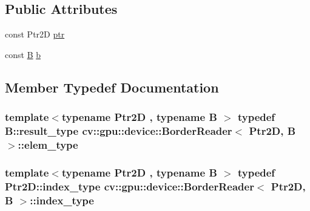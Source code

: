 \subsection*{Public Attributes}
\begin{DoxyCompactItemize}
\item 
const Ptr2\-D \hyperlink{structcv_1_1gpu_1_1device_1_1BorderReader_a7b33c15f65ff4160736d30ad12fc8f3e}{ptr}
\item 
const \hyperlink{tracking_8hpp_abfbb8a90031c2fb62897dafb4d390f6d}{B} \hyperlink{structcv_1_1gpu_1_1device_1_1BorderReader_ac633af0935bfd05794a8fe092c475895}{b}
\end{DoxyCompactItemize}


\subsection{Member Typedef Documentation}
\hypertarget{structcv_1_1gpu_1_1device_1_1BorderReader_a5030228ec7ba89b50ff06a7bdf3c6c24}{
\subsubsection[{elem\-\_\-type}]{\setlength{\rightskip}{0pt plus 5cm}template$<$typename Ptr2\-D , typename B $>$ typedef B\-::result\-\_\-type {\bf cv\-::gpu\-::device\-::\-Border\-Reader}$<$ Ptr2\-D, {\bf B} $>$\-::{\bf elem\-\_\-type}}}\label{structcv_1_1gpu_1_1device_1_1BorderReader_a5030228ec7ba89b50ff06a7bdf3c6c24}
\hypertarget{structcv_1_1gpu_1_1device_1_1BorderReader_ac86d4ef631131cd95a9b3fe535a0210b}{
\subsubsection[{index\-\_\-type}]{\setlength{\rightskip}{0pt plus 5cm}template$<$typename Ptr2\-D , typename B $>$ typedef Ptr2\-D\-::index\-\_\-type {\bf cv\-::gpu\-::device\-::\-Border\-Reader}$<$ Ptr2\-D, {\bf B} $>$\-::{\bf index\-\_\-type}}}\label{structcv_1_1gpu_1_1device_1_1BorderReader_ac86d4ef631131cd95a9b3fe535a0210b}



